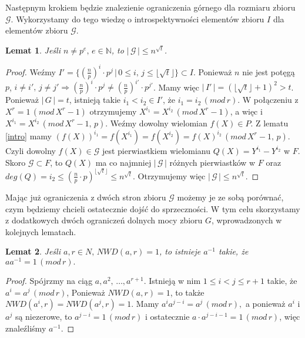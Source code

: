 \documentclass[declaration,shortabstract]{iithesis}
\theoremstyle{definition}
\theoremstyle{remark} \newtheorem{observation}{Obserwacja}
\theoremstyle{plain} \newtheorem{theorem}{Twierdzenie}
\theoremstyle{plain} \newtheorem{lemma}{Lemat}
\theoremstyle{remark} \newtheorem*{remark*}{Uwaga}
\theoremstyle{reminder} \newtheorem*{reminder*}{Przypomnienie}
\begin{document}
Następnym krokiem będzie znalezienie ograniczenia górnego dla rozmiaru zbioru $\mathcal{G}$. Wykorzystamy do tego wiedzę o introspektywności elementów zbioru $I$ dla elementów zbioru $\mathcal{G}$.

\begin{lemma} \label{upper}
	Jeśli $n \neq p^e, \, e \in \mathbb{N}$, to $| \, \mathcal{G} \, | \leq n^{\sqrt{t}}$.
\end{lemma}
	
\begin{proof}
	Weźmy $I' = \{(\frac{n}{p})^i \cdot p^j \, | \, 0 \leq i, \, j \leq \lfloor \sqrt{t} \rfloor \} \subset I$. Ponieważ $n$ nie jest potęgą $p$, $i \neq i', \, j \neq j' \Rightarrow (\frac{n}{p})^i \cdot p^j \neq (\frac{n}{p})^{i'} \cdot p^{j'}$. Mamy więc $| \, I' \, | = (\lfloor \sqrt{t} \rfloor + 1)^2 > t$. Ponieważ $| \, G \, | = t$, istnieją takie $i_1 < i_2 \in I'$, że $i_1 = i_2 \, (mod \, r)$. W połączeniu z $X^r = 1 \, (mod \, X^r - 1)$ otrzymujemy $X^{i_1} = X^{i_2} \, (mod \, X^r - 1)$, a więc i $X^{i_1} = X^{i_2} \, (mod \, X^r - 1, \, p)$.  Weźmy dowolny wielomian $f(X) \in P$. Z lematu \ref{intro} mamy $(f(X))^{i_1} = f(X^{i_1}) = f(X^{i_2}) = f(X)^{i_2} \, (mod \,  X^r - 1, \, p)$. Czyli dowolny $f(X) \in \mathcal{G}$ jest pierwiastkiem wielomianu $Q(X) = Y^{i_1} - Y^{i_2}$ w $F$. Skoro $\mathcal{G} \subset F$, to $Q(X)$ ma co najmniej $| \, \mathcal{G} \, |$ różnych pierwiastków w $F$ oraz $deg(Q) = i_2 \leq (\frac{n}{p} \cdot p)^{\lfloor \sqrt{t} \rfloor} \leq n^{\sqrt{t}}$. Otrzymujemy więc $| \, \mathcal{G} \, | \leq n^{\sqrt{t}}$.
\end{proof}

Mając już ograniczenia z dwóch stron zbioru $\mathcal{G}$ możemy je ze sobą porównać, czym będziemy chcieli ostatecznie dojść do sprzeczności. W tym celu skorzystamy z dodatkowych dwóch ograniczeń dolnych mocy zbioru $G$, wprowadzonych w kolejnych lematach.

\begin{lemma}\label{odwrotny}
	Jeśli $a, r \in N, \, NWD(a, r) = 1$, to istnieje $a^{-1}$ takie, że $aa^{-1} = 1 \, (mod \, r).$
\end{lemma}
	
\begin{proof}
	Spójrzmy na ciąg $a, a^2, \, \dots, a^{r+1}$. Istnieją w nim $1 \leq i < j \leq r + 1$ takie, że $a^i = a^j \, (mod \, r)$, Ponieważ $NWD(a, r) = 1$, to także $NWD(a^i, r) = NWD(a^j, r) = 1$. Mamy $a^ia^{j-i} = a^j \, (mod \, r),$ a ponieważ $a^i$ i $a^j$ są niezerowe, to $a^{j - i} = 1 \, (mod \, r)$ i ostatecznie $a \cdot a^{j - i - 1} = 1 \, (mod \, r)$, więc znaleźliśmy $a^{-1}$.
\end{proof}
\end{document}
